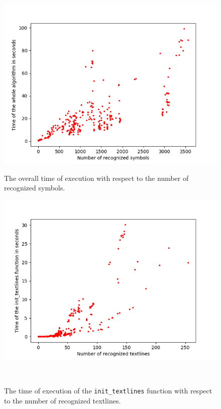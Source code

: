 \begin{figure}[t]
    \includegraphics[width=\linewidth]{img/results/symbolsTimeAll.png}
    \caption{The overall time of execution with respect to the number of recognized symbols.}
    \label{fig:symbolsTime}
\endminipage\hfill 
{}
    \centering
    \includegraphics[width=\linewidth]{img/results/textlinesTimeInit.png}
    \caption{The time of execution of the \texttt{init\_textlines} function with respect to the number of recognized textlines.}
    \label{fig:textlinesTimeInit}
\endminipage\\

\end{figure}
